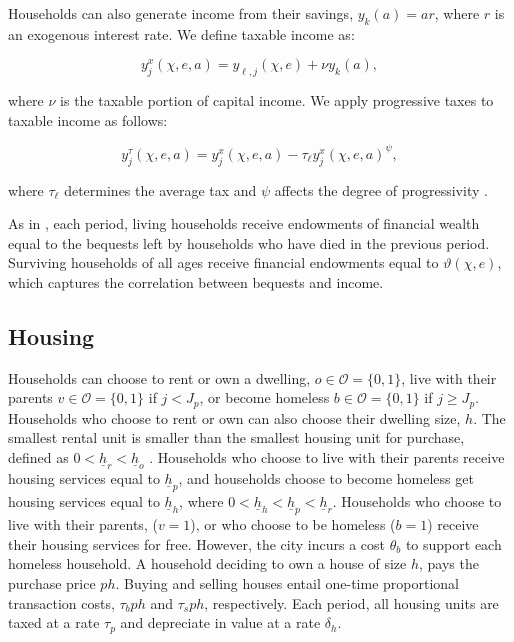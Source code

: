 \documentclass[parskip=full]{article}
\begin{document}
Households can also generate income from their savings, $y_{k}(a)=ar$, where $r$ is an exogenous interest rate. We define taxable income as:

\begin{equation*}\label{eq:taxable_labor_income}
  y^{x}_{j}(\chi,e,a) =y_{\ell,j}(\chi,e)+\nu y_{k}(a),
\end{equation*}

\noindent where $\nu$ is the taxable portion of capital income. We apply progressive taxes to taxable income as follows:

\begin{equation}\label{eq:income_tax}
  y^{\tau}_{j}(\chi,e,a) = y^{x}_{j}(\chi,e,a)-\tau_{\ell}y^{x}_{j}(\chi,e,a)^{\psi},
\end{equation}

\noindent where $\tau_{\ell}$ determines the average tax and $\psi$ affects the degree of progressivity \citep{hsv-2020}.

As in \citet{kkk-2021}, each period, living households receive endowments of financial wealth equal to the bequests left by households who have died in the previous period. Surviving households of all ages receive financial endowments equal to $\vartheta (\chi,e)$, which captures the correlation between bequests and income.

\subsection{Housing}\label{subsection:housing_choice}

Households can choose to rent or own a dwelling, $o \in \mathcal{O}=\{0,1\}$, live with their parents $v \in \mathcal{O}=\{0,1\}$ if $j<J_{p}$, or become homeless $b \in \mathcal{O}=\{0,1\}$ if $j \geq J_{p}$. Households who choose to rent or own can also choose their dwelling size, $h$. The smallest rental unit is smaller than the smallest housing unit for purchase, defined as $0<\underline{h}_{r}<\underline{h}_{o}$ \citep{gervais,sommeretal-2013,sommersullivan-2017,kaplanetal-2019}. Households who choose to live with their parents receive housing services equal to $\underline{h}_{p}$, and households choose to become homeless get housing services equal to $\underline{h}_{h}$, where $0<\underline{h}_{h}<\underline{h}_{p}<\underline{h}_{r}$. Households who choose to live with their parents, ($v=1$), or who choose to be homeless ($b=1$) receive their housing services for free. However, the city incurs a cost $\theta_{b}$ to support each homeless household. A household deciding to own a house of size $h$, pays the purchase price $p h$. Buying and selling houses entail one-time proportional transaction costs, $\tau_{b} p h$ and $\tau_{s} p h$, respectively. Each period, all housing units are taxed at a rate $\tau_{p}$ and depreciate in value at a rate $\delta_h$. 
\end{document}

